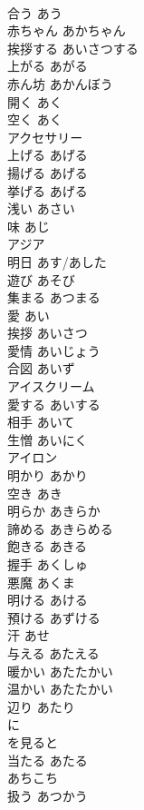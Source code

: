 \documentclass[8pt]{extreport}
\begin{document}
\begin{CJK}{UTF8}{min}
\\	合う	あう	
\\	赤ちゃん	あかちゃん	
\\	挨拶する	あいさつする	
\\	上がる	あがる	
\\	赤ん坊	あかんぼう	
\\	開く	あく	
\\	空く	あく	
\\	アクセサリー		
\\	上げる	あげる	
\\	揚げる	あげる	
\\	挙げる	あげる	
\\	浅い	あさい	
\\	味	あじ	
\\	アジア		
\\	明日	あす/あした	
\\	遊び	あそび	
\\	集まる	あつまる	
\\	愛	あい	
\\	挨拶	あいさつ	
\\	愛情	あいじょう	
\\	合図	あいず	
\\	アイスクリーム		
\\	愛する	あいする	
\\	相手	あいて	
\\	生憎	あいにく	
\\	アイロン		
\\	明かり	あかり	
\\	空き	あき	
\\	明らか	あきらか	
\\	諦める	あきらめる	
\\	飽きる	あきる	
\\	握手	あくしゅ	
\\	悪魔	あくま	
\\	明ける	あける	
\\	預ける	あずける	
\\	汗	あせ	
\\	与える	あたえる	
\\	暖かい	あたたかい	
\\	温かい	あたたかい	
\\	辺り	あたり	
\\	に 
\\	を見ると 
\\	当たる	あたる	
\\	あちこち		
\\	扱う	あつかう	

\end{CJK}
\end{document}

